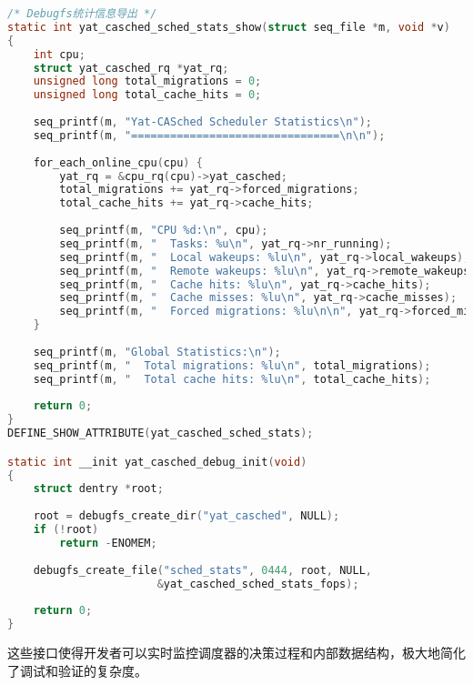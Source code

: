 \begin{tcolorbox} [
    enhanced, colback=purple!5, colframe=purple!40!black, leftrule=3mm, rightrule=0mm, toprule=0mm, bottomrule=0mm, arc=2mm, left=5mm, right=5mm, top=3mm, bottom=3mm, fonttitle=\bfseries, title=\textbf{调度器统计信息导出}
]
\begin{lstlisting}[language=C, basicstyle=\footnotesize\ttfamily, showstringspaces=false]
/* Debugfs统计信息导出 */
static int yat_casched_sched_stats_show(struct seq_file *m, void *v)
{
    int cpu;
    struct yat_casched_rq *yat_rq;
    unsigned long total_migrations = 0;
    unsigned long total_cache_hits = 0;
    
    seq_printf(m, "Yat-CASched Scheduler Statistics\n");
    seq_printf(m, "================================\n\n");
    
    for_each_online_cpu(cpu) {
        yat_rq = &cpu_rq(cpu)->yat_casched;
        total_migrations += yat_rq->forced_migrations;
        total_cache_hits += yat_rq->cache_hits;
        
        seq_printf(m, "CPU %d:\n", cpu);
        seq_printf(m, "  Tasks: %u\n", yat_rq->nr_running);
        seq_printf(m, "  Local wakeups: %lu\n", yat_rq->local_wakeups);
        seq_printf(m, "  Remote wakeups: %lu\n", yat_rq->remote_wakeups);
        seq_printf(m, "  Cache hits: %lu\n", yat_rq->cache_hits);
        seq_printf(m, "  Cache misses: %lu\n", yat_rq->cache_misses);
        seq_printf(m, "  Forced migrations: %lu\n\n", yat_rq->forced_migrations);
    }
    
    seq_printf(m, "Global Statistics:\n");
    seq_printf(m, "  Total migrations: %lu\n", total_migrations);
    seq_printf(m, "  Total cache hits: %lu\n", total_cache_hits);
    
    return 0;
}
DEFINE_SHOW_ATTRIBUTE(yat_casched_sched_stats);

static int __init yat_casched_debug_init(void)
{
    struct dentry *root;
    
    root = debugfs_create_dir("yat_casched", NULL);
    if (!root)
        return -ENOMEM;
        
    debugfs_create_file("sched_stats", 0444, root, NULL, 
                       &yat_casched_sched_stats_fops);
    
    return 0;
}
\end{lstlisting}
\end{tcolorbox}

这些接口使得开发者可以实时监控调度器的决策过程和内部数据结构，极大地简化了调试和验证的复杂度。

